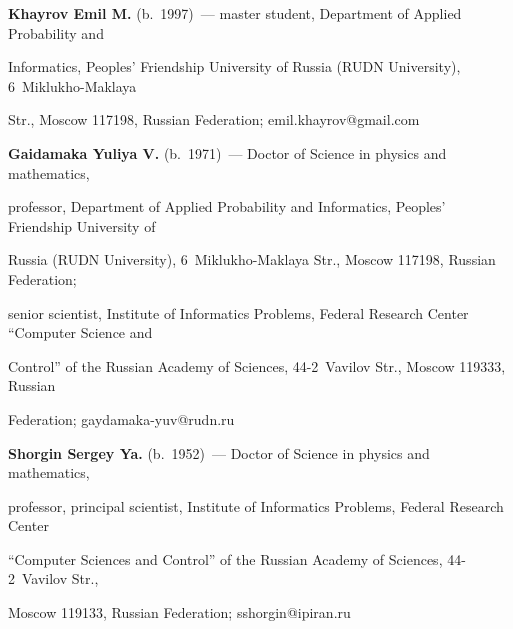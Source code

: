 \noindent


\textbf{Khayrov Emil M.} (b.\ 1997)~--- master student, Department of Applied Probability and 


Informatics, Peoples' Friendship University of Russia (RUDN University), 6~Miklukho-Maklaya 


Str., Moscow 117198, Russian Federation; \mbox{emil.khayrov@gmail.com}





\vspace*{3pt}





\noindent


\textbf{Gaidamaka Yuliya V.} (b.\ 1971)~--- Doctor of Science in physics and mathematics, 


professor, Department of Applied Probability and Informatics, Peoples' Friendship University of 


Russia (RUDN University), 6~Miklukho-Maklaya Str., Moscow 117198, Russian Federation; 


senior scientist, Institute of Informatics Problems, Federal Research Center ``Computer Science and 


Control'' of the Russian Academy of Sciences, 44-2~Vavilov Str., Moscow 119333, Russian 


Federation; \mbox{gaydamaka-yuv@rudn.ru}





\vspace*{3pt}





\noindent


\textbf{Shorgin Sergey Ya.} (b.\ 1952)~--- Doctor of Science in physics and mathematics, 


professor, principal scientist, Institute of Informatics Problems, Federal Research Center 


``Computer Sciences and Control'' of the Russian Academy of Sciences, 44-2~Vavilov Str., 


Moscow 119133, Russian Federation; \mbox{sshorgin@ipiran.ru}





   





\label{end\stat}





\renewcommand{\bibname}{\protect\rm Литература} 


     


